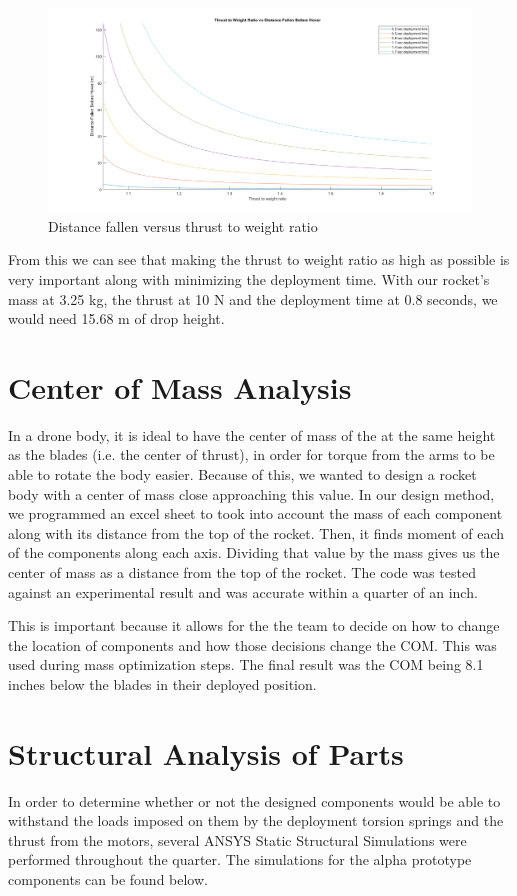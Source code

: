\begin{figure}[H]
    \centering
    \includegraphics[width=\textwidth]{src/figs/ThrusttoWeight_Distance.png}
    \caption{Distance fallen versus thrust to weight ratio}
    \label{fig:dvw}
\end{figure}

From this we can see that making the thrust to weight ratio as high as possible is very important along with minimizing the deployment time. With our rocket's mass at 3.25 kg, the thrust at 10 N and the deployment time at 0.8 seconds, we would need 15.68 m of drop height. 

\section{Center of Mass Analysis}
In a drone body, it is ideal to have the center of mass of the at the same height as the blades (i.e. the center of thrust), in order for torque from the arms to be able to rotate the body easier. Because of this, we wanted to design a rocket body with a center of mass close approaching this value. In our design method, we programmed an excel sheet to took into account the mass of each component along with its distance from the top of the rocket. Then, it finds moment of each of the components along each axis. Dividing that value by the mass gives us the center of mass as a distance from the top of the rocket. The code was tested against an experimental result and was accurate within a quarter of an inch.

This is important because it allows for the the team to decide on how to change the location of components and how those decisions change the COM. This was used during mass optimization steps. The final result was the COM being 8.1 inches below the blades in their deployed position.



\section{Structural Analysis of Parts}
In order to determine whether or not the designed components would be able to withstand the loads imposed on them by the deployment torsion springs and the thrust from the motors, several ANSYS Static Structural Simulations were performed throughout the quarter. The simulations for the alpha prototype components can be found below.


